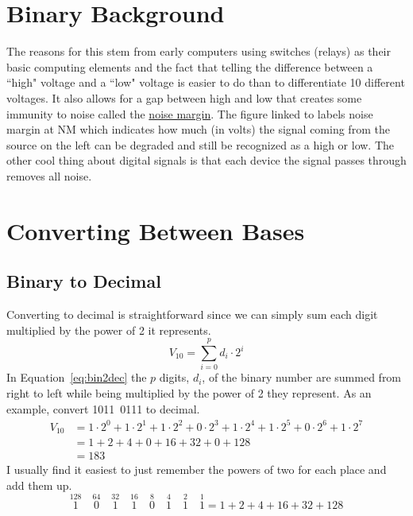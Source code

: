 \section{Binary Background}
The reasons for this stem from early computers 
using switches (relays) as their basic computing elements and the fact that telling the 
difference between a ``high" voltage and a ``low" voltage is easier to do than to differentiate
10 different voltages. It also allows for a gap between high and low that creates some 
immunity to noise called the \href{https://3.bp.blogspot.com/-7GOaQqAncoU/VelAErlx5gI/AAAAAAAARLE/kITWaG8LAws/s1600/noise%2Bmargin.png}{noise margin}. 
The figure linked to labels noise margin at NM which indicates how much (in volts) the signal coming
from the source on the left can be degraded and still be recognized as a high or low. The other 
cool thing about digital signals is that each device the signal passes through removes
all noise.

\section{Converting Between Bases}
\subsection{Binary to Decimal}
Converting to decimal is straightforward since we can simply sum each digit multiplied by the 
power of 2 it represents. 
\begin{equation}
	\label{eq:bin2dec}
	V_{10} = \sum_{i=0}^p d_i \cdot 2^i
\end{equation}
In Equation~\ref{eq:bin2dec} the $p$ digits, $d_i$, of the binary number are summed from right 
to left while being multiplied by the power of 2 they represent. As an example, convert 
1011~0111 to decimal.
\begin{equation}
	\begin{split}
	V_{10} &= 1\cdot2^0 + 1\cdot2^1 + 1\cdot2^2 + 0\cdot2^3 + 1\cdot2^4 + 1\cdot2^5 + 0\cdot2^6 + 1\cdot2^7\\
		&= 1 + 2 + 4 + 0 + 16 + 32 + 0 + 128\\
		&= 183
	\end{split}
\end{equation}
I usually find it easiest to just remember the powers of two for each place and add them up.
\begin{equation}
	\overset{128}{1}\quad\overset{64}{0}\quad\overset{32}{1}\quad\overset{16}{1}\quad\overset{8}{0}\quad
	\overset{4}{1}\quad\overset{2}{1}\quad\overset{1}{1} = 1 + 2 + 4 + 16 + 32 + 128
\end{equation}

